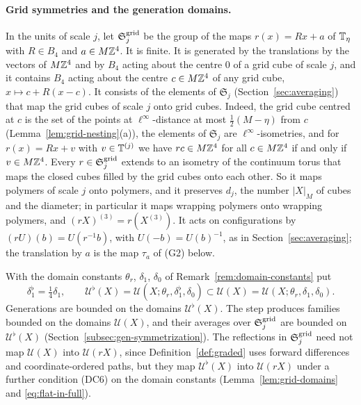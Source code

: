 \paragraph{Grid symmetries and the generation domains.} In the units of scale $j$, let $\mathfrak S^{\rm grid}_j$ be the group of the maps $r(x)=Rx+a$ of $\mathbb T_\eta$ with $R\in B_4$ and $a\in M\mathbb Z^4$. It is finite. It is generated by the translations by the vectors of $M\mathbb Z^4$ and by $B_4$ acting about the centre $0$ of a grid cube of scale $j$, and it contains $B_4$ acting about the centre $c\in M\mathbb Z^4$ of any grid cube, $x\mapsto c+R(x-c)$. It consists of the elements of $\mathfrak S_j$ (Section~\ref{sec:averaging}) that map the grid cubes of scale $j$ onto grid cubes. Indeed, the grid cube centred at $c$ is the set of the points at $\ell^\infty$-distance at most $\frac12(M-\eta)$ from $c$ (Lemma~\ref{lem:grid-nesting}(a)), the elements of $\mathfrak S_j$ are $\ell^\infty$-isometries, and for $r(x)=Rx+v$ with $v\in\mathbb T^{(j)}$ we have $rc\in M\mathbb Z^4$ for all $c\in M\mathbb Z^4$ if and only if $v\in M\mathbb Z^4$. Every $r\in\mathfrak S^{\rm grid}_j$ extends to an isometry of the continuum torus that maps the closed cubes filled by the grid cubes onto each other. So it maps polymers of scale $j$ onto polymers, and it preserves $d_j$, the number $|X|_M$ of cubes and the diameter; in particular it maps wrapping polymers onto wrapping polymers, and $(rX)^{(3)}=r(X^{(3)})$. It acts on configurations by $(rU)(b)=U(r^{-1}b)$, with $U(-b)=U(b)^{-1}$, as in Section~\ref{sec:averaging}; the translation by $a$ is the map $\tau_a$ of (G2) below.

With the domain constants $\theta_r$, $\delta_1$, $\delta_0$ of Remark~\ref{rem:domain-constants} put
\[
\delta_1^\flat=\tfrac14\delta_1,\qquad\mathcal U^\flat(X)=\mathcal U(X;\theta_r,\delta_1^\flat,\delta_0)\subset\mathcal U(X)=\mathcal U(X;\theta_r,\delta_1,\delta_0).
\]
Generations are bounded on the domains $\mathcal U^\flat(X)$. The step produces families bounded on the domains $\mathcal U(X)$, and their averages over $\mathfrak S^{\rm grid}_j$ are bounded on $\mathcal U^\flat(X)$ (Section~\ref{subsec:gen-symmetrization}). The reflections in $\mathfrak S^{\rm grid}_j$ need not map $\mathcal U(X)$ into $\mathcal U(rX)$, since Definition~\ref{def:graded} uses forward differences and coordinate-ordered paths, but they map $\mathcal U^\flat(X)$ into $\mathcal U(rX)$ under a further condition (DC6) on the domain constants (Lemma~\ref{lem:grid-domains} and \eqref{eq:flat-in-full}).

